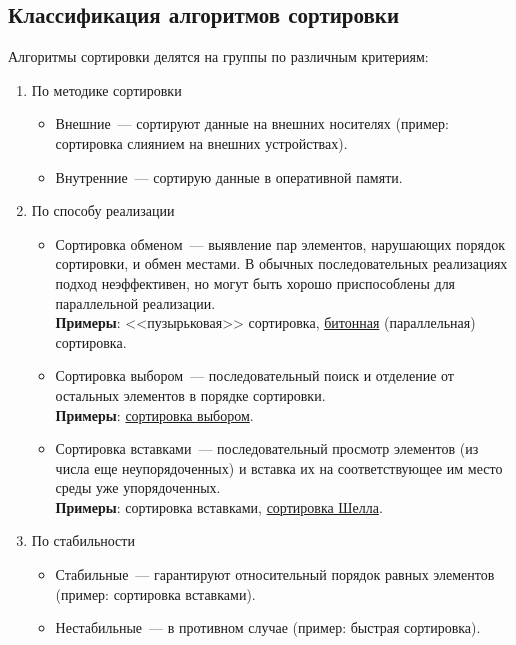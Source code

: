 \subsection{Классификация алгоритмов сортировки}
Алгоритмы сортировки делятся на группы по различным критериям:
\begin{enumerate}
  \item По методике сортировки \begin{itemize}
          \item Внешние~--- сортируют данные на внешних носителях (пример: сортировка слиянием на внешних устройствах).
          \item Внутренние~--- сортирую данные в оперативной памяти.
        \end{itemize}
  \item По способу реализации
        \begin{itemize}
          \item Сортировка обменом~--- выявление пар элементов, нарушающих порядок сортировки, и обмен местами.
                В обычных последовательных реализациях подход неэффективен, но могут быть хорошо приспособлены для
                параллельной реализации.\\
                \textbf{Примеры}: <<пузырьковая>> сортировка, \href{https://en.wikipedia.org/wiki/Bitonic_sorter}{битонная} (параллельная) сортировка.
          \item Сортировка выбором~--- последовательный поиск и отделение от остальных элементов в порядке сортировки.\\
                \textbf{Примеры}: \href{https://en.wikipedia.org/wiki/Selection_sort}{сортировка выбором}.
          \item Сортировка вставками~--- последовательный просмотр элементов (из числа еще неупорядоченных) и вставка их
                на соответствующее им место среды уже упорядоченных.\\
                \textbf{Примеры}: сортировка вставками, \href{https://en.wikipedia.org/wiki/Shellsort}{сортировка Шелла}.
        \end{itemize}
  \item По стабильности \begin{itemize}
          \item Стабильные~--- гарантируют относительный порядок равных элементов (пример: сортировка вставками).
          \item Нестабильные~--- в противном случае (пример: быстрая сортировка).
        \end{itemize}

\end{enumerate}
